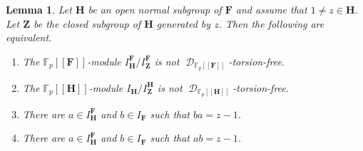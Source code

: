 \documentclass[11pt]{amsart}
\newtheorem{lem}{Lemma}[section]
\numberwithin{claimcounter}{lem}
\DeclareMathOperator{\D}{\mathcal D}
\newcommand{\F}{\mathbb{F}}
\begin{document}
  \begin{lem} \label{critdf} Let $\mathbf H$ be an open normal  subgroup of $\mathbf F$ and assume that $1\ne z\in \mathbf H$. Let $\mathbf Z$ be the closed subgroup of $\mathbf H$ generated by $z$. Then the following are equivalent.
  \begin{enumerate}
  \item [(a)]The  $\F_p[[\mathbf F]]$-module $ I_\mathbf H^{\mathbf F}/I^{\mathbf F}_\mathbf Z$ is not $\D_{\F_p[[\mathbf F]]}$-torsion-free.
  \item [(b)]The  $\F_p[[\mathbf H]]$-module $ I_\mathbf H/I^{\mathbf H}_\mathbf Z$ is not $\D_{\F_p[[\mathbf H]]}$-torsion-free.
    \item[(c)] There are $a\in  I_\mathbf H^{\mathbf F}$ and $b\in I_{\mathbf F}$ such that $ba=z-1$.
  \item [(d)]There are $a\in  I_\mathbf H^{\mathbf F}$ and $b\in I_{\mathbf F}$ such that $ab=z-1$.  
  

  \end{enumerate}

\end{lem}
\end{document}
